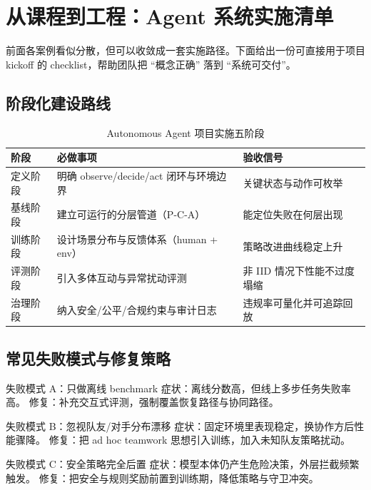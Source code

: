 \section{从课程到工程：Agent 系统实施清单}

前面各案例看似分散，但可以收敛成一套实施路径。下面给出一份可直接用于项目 kickoff 的 checklist，帮助团队把 ``概念正确'' 落到 ``系统可交付''。

\subsection{阶段化建设路线}
\begin{table}[H]
\centering
\begin{tabular}{p{2.5cm}p{4.8cm}p{4.3cm}}
\toprule
\textbf{阶段} & \textbf{必做事项} & \textbf{验收信号} \\
\midrule
定义阶段 & 明确 observe/decide/act 闭环与环境边界 & 关键状态与动作可枚举 \\
基线阶段 & 建立可运行的分层管道（P-C-A） & 能定位失败在何层出现 \\
训练阶段 & 设计场景分布与反馈体系（human + env） & 策略改进曲线稳定上升 \\
评测阶段 & 引入多体互动与异常扰动评测 & 非 IID 情况下性能不过度塌缩 \\
治理阶段 & 纳入安全/公平/合规约束与审计日志 & 违规率可量化并可追踪回放 \\
\bottomrule
\end{tabular}
\caption{Autonomous Agent 项目实施五阶段}
\end{table}

\subsection{常见失败模式与修复策略}
\begin{knowledgebox}{失败模式 A：只做离线 benchmark}
症状：离线分数高，但线上多步任务失败率高。
修复：补充交互式评测，强制覆盖恢复路径与协同路径。
\end{knowledgebox}

\begin{knowledgebox}{失败模式 B：忽视队友/对手分布漂移}
症状：固定环境里表现稳定，换协作方后性能骤降。
修复：把 ad hoc teamwork 思想引入训练，加入未知队友策略扰动。
\end{knowledgebox}

\begin{knowledgebox}{失败模式 C：安全策略完全后置}
症状：模型本体仍产生危险决策，外层拦截频繁触发。
修复：把安全与规则奖励前置到训练期，降低策略与守卫冲突。
\end{knowledgebox}


